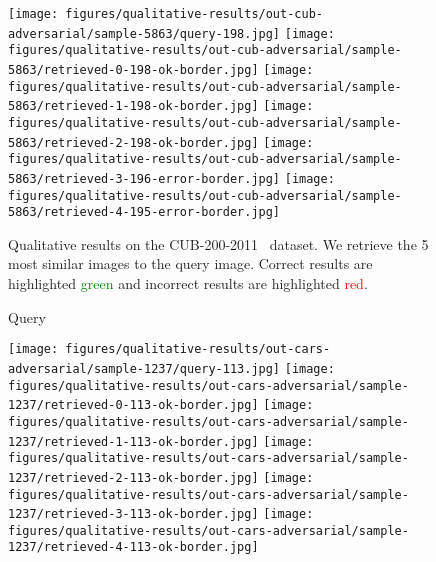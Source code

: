\documentclass[10pt,journal,compsoc]{IEEEtran}
\begin{document}
\begin{figure*}[htbp]
\begin{center}
    \vspace{0.2cm}
    \texttt{[image: figures/qualitative-results/out-cub-adversarial/sample-5863/query-198.jpg]}
    \texttt{[image: figures/qualitative-results/out-cub-adversarial/sample-5863/retrieved-0-198-ok-border.jpg]}
    \texttt{[image: figures/qualitative-results/out-cub-adversarial/sample-5863/retrieved-1-198-ok-border.jpg]}
    \texttt{[image: figures/qualitative-results/out-cub-adversarial/sample-5863/retrieved-2-198-ok-border.jpg]}
    \texttt{[image: figures/qualitative-results/out-cub-adversarial/sample-5863/retrieved-3-196-error-border.jpg]}
    \texttt{[image: figures/qualitative-results/out-cub-adversarial/sample-5863/retrieved-4-195-error-border.jpg]}

    \end{center}
    \caption{Qualitative results on the CUB-200-2011~\cite{WahCUB_200_2011} dataset. 
             We retrieve the 5 most similar images to the query image.
             Correct results are highlighted \textcolor{green}{green} and incorrect results are highlighted \textcolor{red}{red}.}
    \label{fig:qualitative-cub}
\end{figure*}\begin{figure*}[htbp]
    \begin{center}
    \begin{minipage}{0.16\textwidth}
    \centering
    Query
    \end{minipage}
    \begin{minipage}{0.16\textwidth}
    \end{minipage}
    \begin{minipage}{0.16\textwidth}
    \end{minipage}
    \begin{minipage}{0.16\textwidth}
    \end{minipage}
    \begin{minipage}{0.16\textwidth}
    \end{minipage}
    \begin{minipage}{0.16\textwidth}
    \end{minipage}
    \hspace{0.5cm}

    \texttt{[image: figures/qualitative-results/out-cars-adversarial/sample-1237/query-113.jpg]}
    \texttt{[image: figures/qualitative-results/out-cars-adversarial/sample-1237/retrieved-0-113-ok-border.jpg]}
    \texttt{[image: figures/qualitative-results/out-cars-adversarial/sample-1237/retrieved-1-113-ok-border.jpg]}
    \texttt{[image: figures/qualitative-results/out-cars-adversarial/sample-1237/retrieved-2-113-ok-border.jpg]}
    \texttt{[image: figures/qualitative-results/out-cars-adversarial/sample-1237/retrieved-3-113-ok-border.jpg]}
    \texttt{[image: figures/qualitative-results/out-cars-adversarial/sample-1237/retrieved-4-113-ok-border.jpg]}


\end{center}
\end{figure*}
\end{document}
